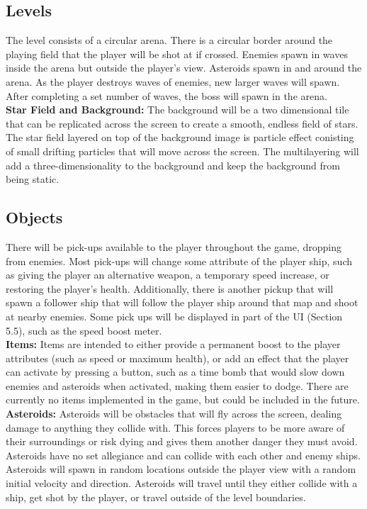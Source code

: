 \documentclass[12pt]{article}       %
\def\hs{\hspace{15pt}}
\begin{document}
\subsection{Levels} %

	\hs {\bf Level design:} The level consists of a circular arena. There is a circular border around the playing field that the player will be shot at if crossed. Enemies spawn in waves inside the arena but outside the player's view. Asteroids spawn in and around the arena. As the player destroys waves of enemies, new larger waves will spawn. After completing a set number of waves, the boss will spawn in the arena. \\

	{\bf Star Field and Background:} The background will be a two dimensional tile that can be replicated across the screen to create a smooth, endless field of stars. The star field layered on top of the background image is particle effect conisting of small drifting particles that will move across the screen. The multilayering will add a three-dimensionality to the background and keep the background from being static. 

\subsection{Objects} %

	\hs {\bf Pick-ups:}  There will be pick-ups available to the player throughout the game, dropping from enemies. Most pick-ups will change some attribute of the player ship, such as giving the player an alternative weapon, a temporary speed increase, or restoring the player's health. Additionally, there is another pickup that will spawn a follower ship that will follow the player ship around that map and shoot at nearby enemies. Some pick ups will be displayed in part of the UI (Section 5.5), such as the speed boost meter. \\

	{\bf  Items:} Items are intended to either provide a permanent boost to the player attributes (such as speed or maximum health), or add an effect that the player can activate by pressing a button, such as a time bomb that would slow down enemies and asteroids when activated, making them easier to dodge. There are currently no items implemented in the game, but could be included in the future. \\

	{\bf Asteroids:}  Asteroids will be obstacles that will fly across the screen, dealing damage to anything they collide with. This forces players to be more aware of their surroundings or risk dying and gives them another danger they must avoid. Asteroids have no set allegiance and can collide with each other and enemy ships. Asteroids will spawn in random locations outside the player view with a random initial velocity and direction. Asteroids will travel until they either collide with a ship, get shot by the player, or travel outside of the level boundaries.
\end{document}
